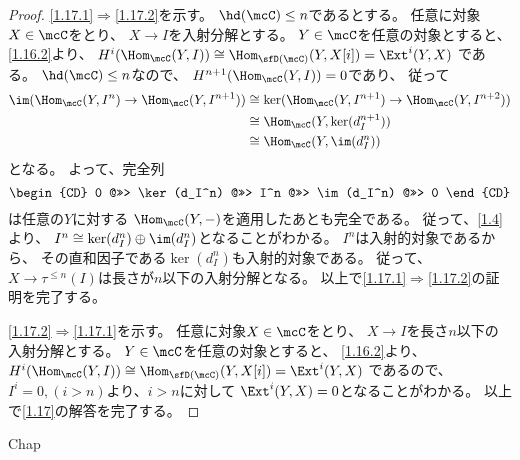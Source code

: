 \documentclass[uplatex,dvipdfmx]{jsarticle}
\begin{document}
\begin{proof}
  \ref{1.17.1}\(\Rightarrow\)\ref{1.17.2}を示す。
  \(\hd(\mcC)\leq n\)であるとする。
  任意に対象\(X\in \mcC\)をとり、
  \(X\to I\)を入射分解とする。
  \(Y\in \mcC\)を任意の対象とすると、
  \autoref{1.16.2}より、
  \(H^i(\Hom_{\mcC}(Y,I)) \cong \Hom_{\sfD(\mcC)}(Y,X[i]) = \Ext^i(Y,X)\)
  である。
  \(\hd(\mcC)\leq n\)なので、
  \(H^{n+1}(\Hom_{\mcC}(Y,I)) = 0\)であり、
  従って
  \begin{align*}
    \im(\Hom_{\mcC}(Y,I^n)\to \Hom_{\mcC}(Y,I^{n+1}))
    &\cong \ker(\Hom_{\mcC}(Y,I^{n+1})\to \Hom_{\mcC}(Y,I^{n+2})) \\
    &\cong \Hom_{\mcC}(Y,\ker(d_I^{n+1})) \\
    &\cong \Hom_{\mcC}(Y,\im(d_I^n))
  \end{align*}
  となる。
  よって、完全列
  \[
  \begin{CD}
    0 @>>> \ker(d_I^n) @>>> I^n @>>> \im(d_I^n) @>>> 0
  \end{CD}
  \]
  は任意の\(Y\)に対する
  \(\Hom_{\mcC}(Y,-)\)を適用したあとも完全である。
  従って、\autoref{1.4}より、
  \(I^n\cong \ker(d_I^n) \oplus \im(d_I^n)\)となることがわかる。
  \(I^n\)は入射的対象であるから、
  その直和因子である\(\ker(d_I^n)\)も入射的対象である。
  従って、\(X\to \tau^{\leq n}(I)\)は長さが\(n\)以下の入射分解となる。
  以上で\ref{1.17.1}\(\Rightarrow\)\ref{1.17.2}の証明を完了する。

  \ref{1.17.2}\(\Rightarrow\)\ref{1.17.1}を示す。
  任意に対象\(X\in \mcC\)をとり、
  \(X\to I\)を長さ\(n\)以下の入射分解とする。
  \(Y\in \mcC\)を任意の対象とすると、
  \autoref{1.16.2}より、
  \(H^i(\Hom_{\mcC}(Y,I)) \cong \Hom_{\sfD(\mcC)}(Y,X[i]) = \Ext^i(Y,X)\)
  であるので、\(I^i = 0, (i>n)\)より、\(i>n\)に対して
  \(\Ext^i(Y,X) = 0\)となることがわかる。
  以上で\autoref{1.17}の解答を完了する。
\end{proof}





\ifcsname Chap\endcsname\else
\printbibliography
\end{document}
